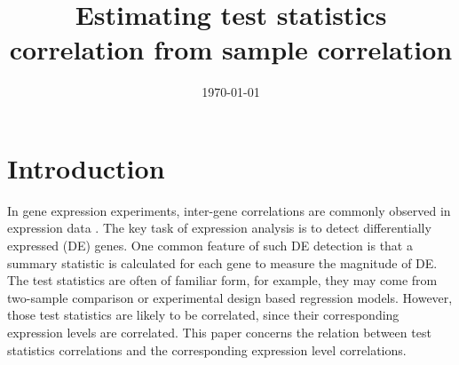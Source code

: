\documentclass[12pt, a4paper]{article}
\title{Estimating test statistics correlation from sample correlation}
\date{\today} %
\begin{document}
	\maketitle
	\section{Introduction}
%	
%
%	

	In gene expression experiments, inter-gene correlations are commonly observed in expression data \citep{efron2012large, qiu2005effects,barry2008statistical, efron2007correlation,storey2003positive, huang2013gene, wu2012camera, gatti2010heading}.
	 The key task of expression analysis is to detect differentially expressed (DE) genes. One common feature of such DE detection is that a
	  summary statistic is calculated for each gene to measure the magnitude of DE. The test statistics are often of familiar form, for example, 
	  they may come from two-sample comparison or experimental design based regression models. However, those test statistics are likely to be 
	  correlated, since their 
	  corresponding expression levels are correlated. This paper concerns the relation between test statistics correlations and the 
	  corresponding expression level correlations.
	
\end{document}
